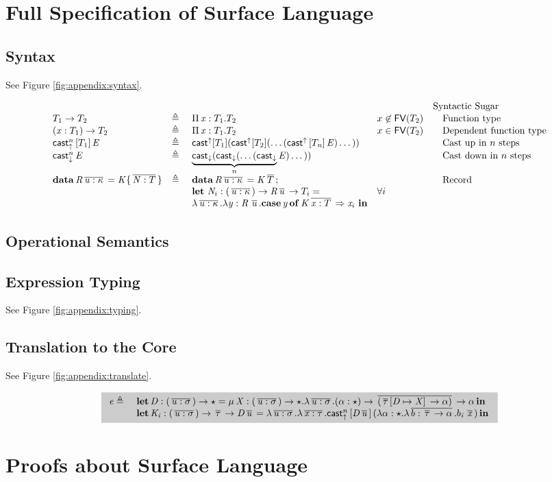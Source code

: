 \section{Full Specification of Surface Language}
\subsection{Syntax}
See Figure \ref{fig:appendix:syntax}.
\begin{figure*}
\centering
\gram{\ottpgm\ottinterrule
\ottdecl\ottinterrule
\ottu\ottinterrule
\ottp\ottinterrule
\ottE\ottinterrule
\ottV\ottinterrule
\ottGs}
\[\ottsurfsugar\] %
\caption{Syntax of the surface language}
\label{fig:appendix:syntax}
\end{figure*}

\subsection{Operational Semantics}
\ottdefnstepsrc{}
\ottusedrule{\ottdruleSCXXCaseMatch{}}

\subsection{Expression Typing}
See Figure \ref{fig:appendix:typing}.
\begin{figure*}
\ottdefnctxsrc{}\ottinterrule
\ottdefnpgmsrc{}\ottinterrule
\ottdefndeclsrc{}\ottinterrule
\ottdefnpatsrc{}\ottinterrule
\ottdefnexprsrc{}
\caption{Typing rules of the surface language}
\label{fig:appendix:typing}
\end{figure*}

\subsection{Translation to the Core}
See Figure \ref{fig:appendix:translate}.
\begin{figure*}
\ottdefnctxtrans{}\ottinterrule
\ottdefnpgmtrans{}\ottinterrule
\ottdefndecltrans{}
\[\hlmath{\ottdecltrans}\]\ottinterrule %
\ottdefnpattrans{}\ottinterrule
\ottdefnexprtrans{}
\caption{Translation rules of the surface language}
\label{fig:appendix:translate}
\end{figure*}

\section{Proofs about Surface Language}
